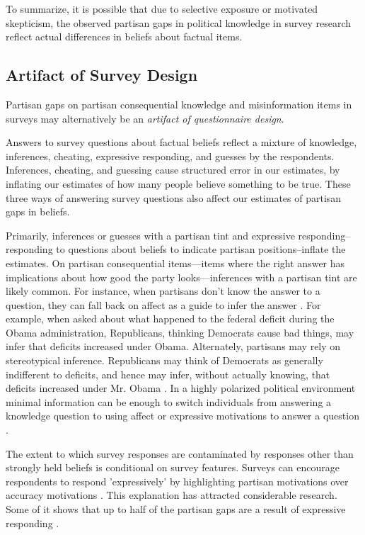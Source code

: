 \documentclass[12pt, letterpaper]{article}
\begin{document}
	To summarize, it is possible that due to selective exposure or motivated skepticism, the observed partisan gaps in political knowledge in survey research reflect actual differences in beliefs about factual items.
	
	\subsection*{Artifact of Survey Design}
	Partisan gaps on partisan consequential knowledge and misinformation items in surveys may alternatively be an \emph{artifact of questionnaire design}.
	
	Answers to survey questions about factual beliefs reflect a mixture of knowledge, inferences, cheating, expressive responding, and guesses by the respondents. Inferences, cheating, and guessing cause structured error in our estimates, by inflating our estimates of how many people believe something to be true. These three ways of answering survey questions also affect our estimates of partisan gaps in beliefs.
	
	Primarily, inferences or guesses with a partisan tint and expressive responding--responding to questions about beliefs to indicate partisan positions--inflate the estimates. On partisan consequential items---items where the right answer has implications about how good the party looks---inferences with a partisan tint are likely common. For instance, when partisans don't know the answer to a question, they can fall back on affect as a guide to infer the answer \citep{malka2022expressive}. For example, when asked about what happened to the federal deficit during the Obama administration, Republicans, thinking Democrats cause bad things, may infer that deficits increased under Obama. Alternately, partisans may rely on stereotypical inference. Republicans may think of Democrats as generally indifferent to deficits, and hence may infer, without actually knowing, that deficits increased under Mr. Obama \citep[e.g.][]{rahn1993role, goggin2020goes}. In a highly polarized political environment minimal information can be enough to switch individuals from answering a knowledge question to using affect or expressive motivations to answer a question \citep{klar2014partisanship, merkley2018party}.
	
	The extent to which survey responses are contaminated by responses other than strongly held beliefs is conditional on survey features. Surveys can encourage respondents to respond 'expressively' by highlighting partisan motivations over accuracy motivations \citep{Zaller1992, petersen2013motivated, klar2014partisanship}. This explanation has attracted considerable research. Some of it shows that up to half of the partisan gaps are a result of expressive responding \citep[][though see \citeauthor{berinsky_2017} \citeyear{berinsky_2017}]{bullocketal_2015,huber_yair_2018, prior2015you}.
	
\end{document}
